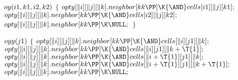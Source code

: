 \B\D$\\{oy}(\\{i1},\\{k1},\\{i2},\\{k2})$ \6
${}\{{}$\1\6
${}\\{opty}[\|i][\|j][\|k].\\{neighbor}[\\{kk}\PP]\K{\AND}\\{cells}[\\{i1}][%
\|j][\\{k1}];{}$\6
${}\\{opty}[\|i][\|j][\|k].\\{neighbor}[\\{kk}\PP]\K{\AND}\\{cells}[\\{i2}][%
\|j][\\{k2}];{}$\6
${}\\{opty}[\|i][\|j][\|k].\\{neighbor}[\\{kk}\PP]\K\NULL;{}$\6
\4${}\}{}$\2\par
\B\4\D$\\{oyy}(\\{j1})$ \6
${}\{{}$\1\6
${}\\{opty}[\|i][\|j][\|k].\\{neighbor}[\\{kk}\PP]\K{\AND}\\{cells}[\|i][%
\\{j1}][\|k];{}$\6
${}\\{opty}[\|i][\|j][\|k].\\{neighbor}[\\{kk}\PP]\K{\AND}\\{cells}[\|i][%
\\{j1}][\|k+\T{1}];{}$\6
${}\\{opty}[\|i][\|j][\|k].\\{neighbor}[\\{kk}\PP]\K{\AND}\\{cells}[\|i+\T{1}][%
\\{j1}][\|k];{}$\6
${}\\{opty}[\|i][\|j][\|k].\\{neighbor}[\\{kk}\PP]\K{\AND}\\{cells}[\|i+\T{1}][%
\\{j1}][\|k+\T{1}];{}$\6
${}\\{opty}[\|i][\|j][\|k].\\{neighbor}[\\{kk}\PP]\K\NULL;{}$\6
